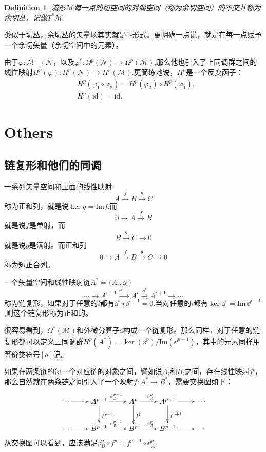 \documentclass[8pt]{book}
\theoremstyle{plain}%
\newtheorem{defi}{Definition}[section]%
\begin{document}
\begin{defi}
流形$\mathcal{M}$每一点的切空间的对偶空间（称为余切空间）的不交并称为余切丛，记做$T^*\mathcal{M}$.
\end{defi}

类似于切丛，余切丛的矢量场其实就是1-形式。更明确一点说，就是在每一点赋予一个余切矢量（余切空间中的元素）。

由于$\varphi:\mathcal{M}\to\mathcal{N}$，以及$\varphi^*:\Omega^p(\mathcal{N})\to\Omega^p(\mathcal{M})$,那么他也引入了上同调群之间的线性映射$H^p(\varphi):H^p(\mathcal{N})\to H^p(\mathcal{M})$.更简练地说，$H^p$是一个反变函子：
\[
\begin{split}
&H^p(\varphi_1\circ\varphi_2)=H^p(\varphi_2)\circ H^p(\varphi_1),\\
&H^p(\mathrm{id})=\mathrm{id}.
\end{split}
\]

\chapter{Others}
\section{链复形和他们的同调}

一系列矢量空间和上面的线性映射
\[
A\xrightarrow{f}B\xrightarrow{g}C
\]
称为正和列，就是说$\ker g=\mathrm{Im} f$.而
\[
0\to A\xrightarrow{f}B
\]
就是说$f$是单射，而
\[
B\xrightarrow{g}C\to 0
\]
就是说$g$是满射。而正和列
\[
0\to A\xrightarrow{f}B\xrightarrow{g}C\to 0
\]
称为短正合列。

一个矢量空间和线性映射链$A^*=\{A_i,\dd_i\}$
\[
\cdots\to A^{i-1}\xrightarrow{\dd^{i-1}}A^i\xrightarrow{\dd^i}A^{i+1}\to \cdots
\]
称为链复形，如果对于任意的$i$都有$\dd^i \circ \dd^{i+1}=0$.当对任意的$i$都有$\ker \dd^i=\mathrm{Im}\, \dd^{i-1}$,则这个链复形称为正和的。

很容易看到，$\Omega^*(\mathcal{M})$和外微分算子$\dd$构成一个链复形。那么同样，对于任意的链复形都可以定义上同调群$H^p(A^*)=\ker (\dd^p)/\mathrm{Im} (\dd^{p-1})$，其中的元素同样用等价类符号$[a]$记。

如果在两条链的每一个对应链的对象之间，譬如说$A_i$和$B_i$之间，存在线性映射$f^i$，那么自然就在两条链之间引入了一个映射$f:A^*\to B^*$，需要交换图如下：
	\[
		\xymatrix{
\cdots\ar[r]&A^{p-1}\ar[r]^{\dd_A^{p-1}}\ar[d]^{f^{p-1}}&A^p\ar[r]^{\dd_A^p}\ar[d]^{f^{p}}&A^{p+1}\ar[r]\ar[d]^{f^{p+1}}&\cdots\\
\cdots\ar[r]&B^{p-1}\ar[r]^{\dd_B^{p-1}}&B^p\ar[r]^{\dd_B^p}&B^{p+1}\ar[r]&\cdots
		}
	\]
从交换图可以看到，应该满足$\dd^{p}_B\circ f^p=f^{p+1}\circ \dd^{p}_A$.
\end{document}
